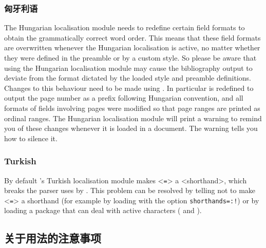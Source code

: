 \subsubsection{匈牙利语}
\label{use:loc:hun}

The Hungarian localisation module needs to redefine certain field formats to obtain the grammatically correct word order. This means that these field formats are overwritten whenever the Hungarian localisation is active, no matter whether they were defined in the preamble or by a custom style. So please be aware that using the Hungarian localisation module may cause the bibliography output to deviate from the format dictated by the loaded style and preamble definitions. Changes to this behaviour need to be made using . In particular  is redefined to output the page number as a prefix following Hungarian convention, and all formats of fields involving pages were modified so that page ranges are printed as ordinal ranges. The Hungarian localisation module will print a warning to remind you of these changes whenever it is loaded in a document. The warning tells you how to silence it.

 \subsubsection{Turkish}
\label{use:loc:tur}

By default 's Turkish localisation module makes <\texttt{=}> a <shorthand>, which breaks the \keyval parser uses by \biblatex. This problem can be resolved by telling  not to make <\texttt{=}> a shorthand (for example by loading  with the option \texttt{shorthands=:!}) or by loading a \keyval package that can deal with active characters ( and ).


\subsection{关于用法的注意事项}%
\label{use:use}


